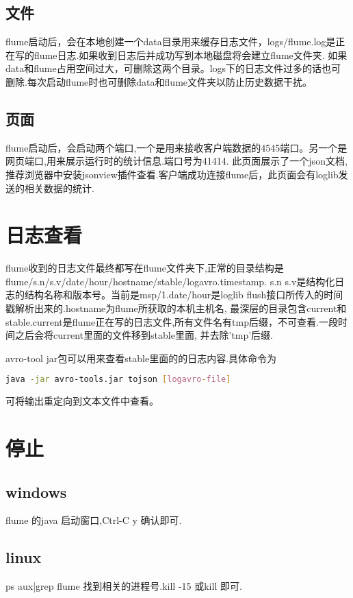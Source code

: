 \documentclass{article}
\begin{document}
\subsection{文件}
flume启动后，会在本地创建一个data目录用来缓存日志文件，logs/flume.log是正在写的flume日志.如果收到日志后并成功写到本地磁盘将会建立flume文件夹.
如果data和flume占用空间过大，可删除这两个目录。logs下的日志文件过多的话也可删除.每次启动flume时也可删除data和flume文件夹以防止历史数据干扰。
\subsection{页面}
flume启动后，会启动两个端口,一个是用来接收客户端数据的4545端口。另一个是网页端口,用来展示运行时的统计信息.端口号为41414.
此页面展示了一个json文档,推荐浏览器中安装jsonview插件查看.客户端成功连接flume后，此页面会有loglib发送的相关数据的统计.

\section{日志查看}
flume收到的日志文件最终都写在flume文件夹下,正常的目录结构是 flume/s.n/s.v/date/hour/hostname/stable/logavro.timestamp.
s.n s.v是结构化日志的结构名称和版本号。当前是msp/1.date/hour是loglib flush接口所传入的时间戳解析出来的.hostname为flume所获取的本机主机名,
最深层的目录包含current和stable.current是flume正在写的日志文件,所有文件名有tmp后缀，不可查看.一段时间之后会将current里面的文件移到stable里面,
并去除'tmp'后缀.

avro-tool jar包可以用来查看stable里面的的日志内容.具体命令为 \\
\begin{lstlisting}[language=BASH]
java -jar avro-tools.jar tojson [logavro-file]
\end{lstlisting}
可将输出重定向到文本文件中查看。 

\section{停止}
\subsection{windows}
flume 的java 启动窗口,Ctrl-C y 确认即可.
\subsection{linux}
ps aux|grep flume 找到相关的进程号.kill -15 或kill 即可.
\end{document}
